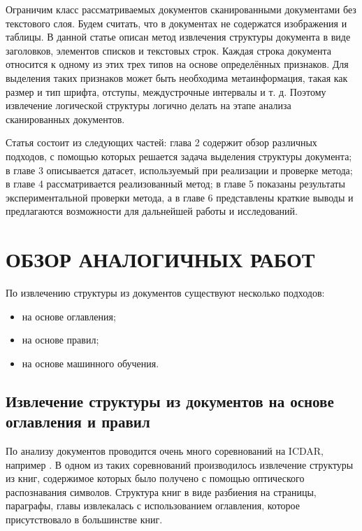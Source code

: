 \documentclass[10pt, a4paper]{ieeeconf}
\begin{document}
Ограничим класс рассматриваемых документов сканированными документами без текстового слоя. Будем считать, что в документах не содержатся изображения и таблицы. В данной статье описан метод извлечения структуры документа в виде заголовков, элементов списков и текстовых строк. Каждая строка документа относится к одному из этих трех типов на основе определённых признаков. Для выделения таких признаков может быть необходима метаинформация, такая как размер и тип шрифта, отступы, междустрочные интервалы и т. д. Поэтому извлечение логической структуры логично делать на этапе анализа сканированных документов.

Статья состоит из следующих частей: глава 2 содержит обзор различных подходов, с помощью которых решается задача выделения структуры документа; в главе 3 описывается датасет, используемый при реализации и проверке метода; в главе 4 рассматривается реализованный метод; в главе 5 показаны результаты экспериментальной проверки метода, а в главе 6 представлены краткие выводы и предлагаются возможности для дальнейшей работы и исследований.

\section{ОБЗОР АНАЛОГИЧНЫХ РАБОТ}

По извлечению структуры из документов существуют несколько подходов:
\begin{itemize}
\item на основе оглавления;
\item на основе правил;
\item на основе машинного обучения.
\end{itemize}

\subsection{Извлечение структуры из документов на основе оглавления и правил}

По анализу документов проводится очень много соревнований на ICDAR, например \cite{link1,link2,link3}. В одном из таких соревнований \cite{link1} производилось извлечение структуры из книг, содержимое которых было получено с помощью оптического распознавания символов. Структура книг в виде разбиения на страницы, параграфы, главы извлекалась с использованием оглавления, которое присутствовало в большинстве книг. 
\end{document}

